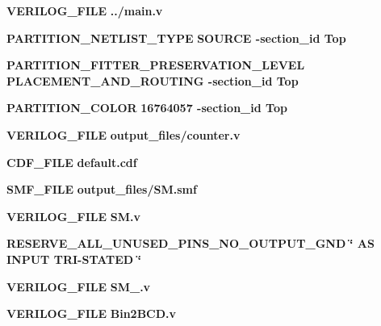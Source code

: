 \begin{DoxyCompactItemize}
\item 
{\bf V\+E\+R\+I\+L\+O\+G\+\_\+\+F\+I\+LE} {\bfseries \textcolor{vhdlchar}{.}\textcolor{vhdlchar}{.}\textcolor{vhdlchar}{/}\textcolor{vhdlchar}{main}\textcolor{vhdlchar}{.}\textcolor{vhdlchar}{v}\textcolor{vhdlchar}{ }} 
\item 
{\bf P\+A\+R\+T\+I\+T\+I\+O\+N\+\_\+\+N\+E\+T\+L\+I\+S\+T\+\_\+\+T\+Y\+PE} {\bfseries \textcolor{vhdlchar}{S\+O\+U\+R\+CE}\textcolor{vhdlchar}{ }\textcolor{vhdlchar}{-\/}\textcolor{vhdlchar}{section\+\_\+id}\textcolor{vhdlchar}{ }\textcolor{vhdlchar}{Top}\textcolor{vhdlchar}{ }} 
\item 
{\bf P\+A\+R\+T\+I\+T\+I\+O\+N\+\_\+\+F\+I\+T\+T\+E\+R\+\_\+\+P\+R\+E\+S\+E\+R\+V\+A\+T\+I\+O\+N\+\_\+\+L\+E\+V\+EL} {\bfseries \textcolor{vhdlchar}{P\+L\+A\+C\+E\+M\+E\+N\+T\+\_\+\+A\+N\+D\+\_\+\+R\+O\+U\+T\+I\+NG}\textcolor{vhdlchar}{ }\textcolor{vhdlchar}{-\/}\textcolor{vhdlchar}{section\+\_\+id}\textcolor{vhdlchar}{ }\textcolor{vhdlchar}{Top}\textcolor{vhdlchar}{ }} 
\item 
{\bf P\+A\+R\+T\+I\+T\+I\+O\+N\+\_\+\+C\+O\+L\+OR} {\bfseries  \textcolor{vhdldigit}{16764057} \textcolor{vhdlchar}{ }\textcolor{vhdlchar}{-\/}\textcolor{vhdlchar}{section\+\_\+id}\textcolor{vhdlchar}{ }\textcolor{vhdlchar}{Top}\textcolor{vhdlchar}{ }} 
\item 
{\bf V\+E\+R\+I\+L\+O\+G\+\_\+\+F\+I\+LE} {\bfseries \textcolor{vhdlchar}{output\+\_\+files}\textcolor{vhdlchar}{/}\textcolor{vhdlchar}{counter}\textcolor{vhdlchar}{.}\textcolor{vhdlchar}{v}\textcolor{vhdlchar}{ }} 
\item 
{\bf C\+D\+F\+\_\+\+F\+I\+LE} {\bfseries \textcolor{keywordflow}{default}\textcolor{vhdlchar}{.}\textcolor{vhdlchar}{cdf}\textcolor{vhdlchar}{ }} 
\item 
{\bf S\+M\+F\+\_\+\+F\+I\+LE} {\bfseries \textcolor{vhdlchar}{output\+\_\+files}\textcolor{vhdlchar}{/}\textcolor{vhdlchar}{SM}\textcolor{vhdlchar}{.}\textcolor{vhdlchar}{smf}\textcolor{vhdlchar}{ }} 
\item 
{\bf V\+E\+R\+I\+L\+O\+G\+\_\+\+F\+I\+LE} {\bfseries \textcolor{vhdlchar}{SM}\textcolor{vhdlchar}{.}\textcolor{vhdlchar}{v}\textcolor{vhdlchar}{ }} 
\item 
{\bf R\+E\+S\+E\+R\+V\+E\+\_\+\+A\+L\+L\+\_\+\+U\+N\+U\+S\+E\+D\+\_\+\+P\+I\+N\+S\+\_\+\+N\+O\+\_\+\+O\+U\+T\+P\+U\+T\+\_\+\+G\+ND} {\bfseries \textcolor{vhdlchar}{\char`\"{}}\textcolor{vhdlchar}{ }\textcolor{vhdlchar}{AS}\textcolor{vhdlchar}{ }\textcolor{vhdlchar}{I\+N\+P\+UT}\textcolor{vhdlchar}{ }\textcolor{vhdlchar}{T\+RI}\textcolor{vhdlchar}{-\/}\textcolor{vhdlchar}{S\+T\+A\+T\+ED}\textcolor{vhdlchar}{ }\textcolor{vhdlchar}{\char`\"{}}\textcolor{vhdlchar}{ }} 
\item 
{\bf V\+E\+R\+I\+L\+O\+G\+\_\+\+F\+I\+LE} {\bfseries \textcolor{vhdlchar}{S\+M\+\_}\textcolor{vhdlchar}{.}\textcolor{vhdlchar}{v}\textcolor{vhdlchar}{ }} 
\item 
{\bf V\+E\+R\+I\+L\+O\+G\+\_\+\+F\+I\+LE} {\bfseries \textcolor{vhdlchar}{Bin2\+B\+CD}\textcolor{vhdlchar}{.}\textcolor{vhdlchar}{v}\textcolor{vhdlchar}{ }} 
\end{DoxyCompactItemize}


